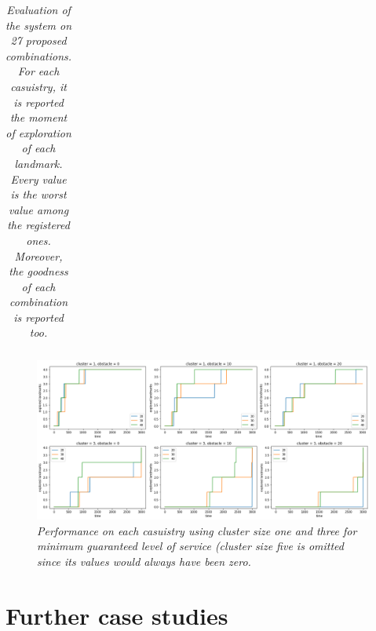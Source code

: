 \begin{table}[H]
\begin{tabular}{| c c c | c c c c | c |}
\end{tabular}
\caption{\label{tab:perf-table}\textit{Evaluation of the system on 27 proposed combinations. For each casuistry, it is reported the moment of exploration of each landmark. Every value is the worst value among the registered ones. Moreover, the goodness of each combination is reported too.}}
\end{table}

\begin{figure}[H]
\centering
\includegraphics[width=\linewidth]{images/ts_all.png}
\caption{\textit{Performance on each casuistry using cluster size one and three for minimum guaranteed level of service (cluster size five is omitted since its values would always have been zero.}}
\label{fig:ts-all}
\end{figure}

\section{Further case studies}

